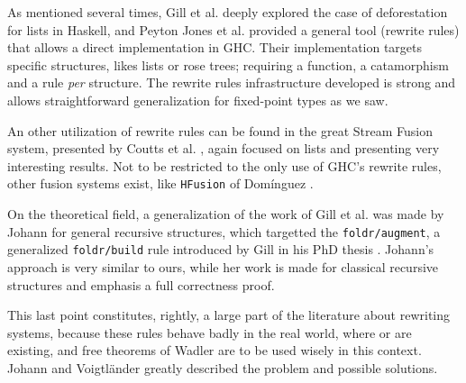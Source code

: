 
As mentioned several times, Gill et al. \cite{Gill:1993:SCD:165180.165214} deeply explored the case of deforestation for lists in Haskell, and Peyton Jones et al. \cite{pbr} provided a general tool (rewrite rules) that allows a direct implementation in GHC. Their implementation targets specific structures, likes lists or rose trees; requiring a  function, a catamorphism and a rule \emph{per} structure. The rewrite rules infrastructure developed is strong and allows straightforward generalization for fixed-point types as we saw.

An other utilization of rewrite rules can be found in the great Stream Fusion system, presented by Coutts et al. \cite{Coutts07streamfusion}, again focused on lists and presenting very interesting results.
Not to be restricted to the only use of GHC's rewrite rules, other fusion systems exist, like \verb|HFusion| of Domínguez \cite{dominguez:hfusion}.

On the theoretical field, a generalization of the work of Gill et al. \cite{Gill:1993:SCD:165180.165214} was made by Johann \cite{Johann:2002:GSF:641433.641471} for general recursive structures, which targetted the \verb|foldr/augment|, a generalized \verb|foldr/build| rule introduced by Gill in his PhD thesis \cite{Gill1996CheapDF}. Johann's approach is very similar to ours, while her work is made for classical recursive structures and emphasis a full correctness proof.

This last point constitutes, rightly, a large part of the literature about rewriting systems, because these rules behave badly in the real world, where  or  are existing, and free theorems of Wadler \cite{Wadler:1989:TF:99370.99404} are to be used wisely in this context. Johann and Voigtländer \cite{JV04} greatly described the problem and possible solutions.

